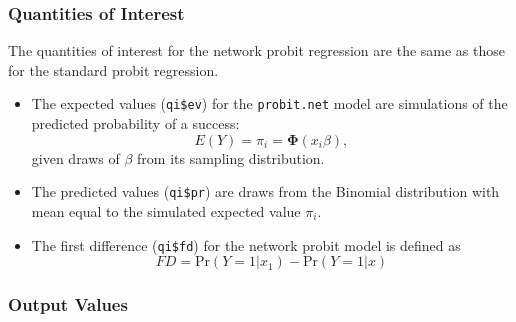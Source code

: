 \subsubsection{Quantities of Interest}
The quantities of interest for the network probit regression are the same as those for the standard probit regression. 
\begin{itemize}
\item The expected values ({\tt qi\$ev}) for the {\tt probit.net} model are simulations of the predicted probability of a success:  
\begin{equation*}
E(Y) = \pi_{i} =  \pmb{\Phi}(x_{i}\beta),
\end{equation*}
given draws of $\beta$ from its sampling distribution.

\item The predicted values ({\tt qi\$pr}) are draws from the Binomial distribution with mean equal to the simulated expected value $\pi_{i}$.

\item The first difference ({\tt qi\$fd}) for the network probit model is defined as 
\begin{equation*}
FD = \text{Pr}(Y = 1 | x_{1}) - \text{Pr}(Y = 1| x)
\end{equation*}
\end{itemize}


\subsubsection{Output Values}

